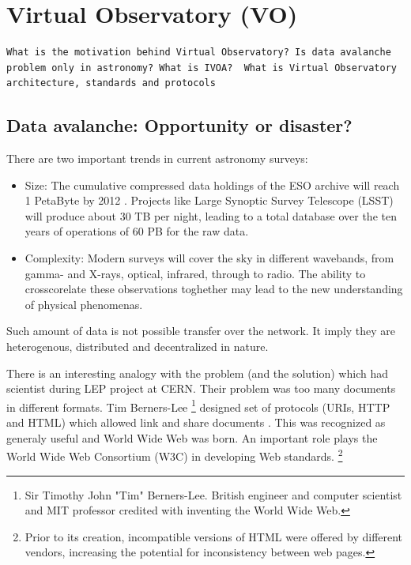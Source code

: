 

\ifpdf
    \graphicspath{{pic/}}
\else
    \graphicspath{{pic/}}
\fi

\chapter{ Virtual Observatory (VO)}

\begin{lstlisting}[frame=single]
What is the motivation behind Virtual Observatory? Is data avalanche
problem only in astronomy? What is IVOA?  What is Virtual Observatory
architecture, standards and protocols
\end{lstlisting}

\section{ Data avalanche: Opportunity or disaster?}

There are two important trends in current astronomy surveys:

\begin{itemize}

  \item{Size:} The cumulative compressed data holdings of the ESO archive will
    reach 1 PetaByte by 2012 \cite{hanisch2010international}. Projects
    like Large Synoptic Survey Telescope (LSST) will produce about 30
    TB per night, leading to a total database over the ten years of
    operations of 60 PB for the raw data.
   
  \item{Complexity:}  Modern surveys will cover the sky in different wavebands, from
    gamma- and X-rays, optical, infrared, through to radio. The ability
    to crosscorelate these observations toghether may lead to the new
    understanding of physical phenomenas.
\end{itemize}

    Such amount of data is not possible transfer over the network. It
    imply they are heterogenous, distributed and decentralized in nature.


    There is an interesting analogy with the problem (and the
    solution) which had scientist during LEP project at CERN.  Their
    problem was too many documents in different formats. Tim
    Berners-Lee \footnote{ Sir Timothy John "Tim" Berners-Lee. British
      engineer and computer scientist and MIT professor credited with
      inventing the World Wide Web.} designed set of protocols (URIs,
    HTTP and HTML) which allowed link and share documents
    \cite{berners1990worldwideweb}. This was recognized as generaly
    useful and World Wide Web was born. An important role plays the
    World Wide Web Consortium (W3C) in developing Web
    standards. \footnote{Prior to its creation, incompatible versions
      of HTML were offered by different vendors, increasing the
      potential for inconsistency between web pages.}
    

